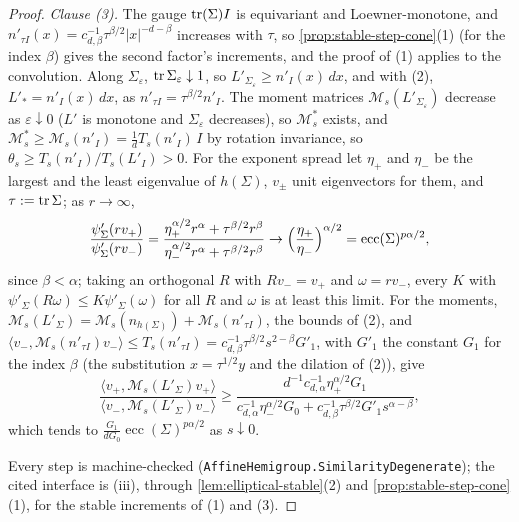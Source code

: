 \begin{proof}
\emph{Clause (3).} The gauge $\operatorname{tr}(\Sigma)I$ is equivariant and Loewner-monotone, and
$n'_{\tau I}(x) = c_{d,\beta}^{-1}\tau^{\beta/2}|x|^{-d-\beta}$ increases with $\tau$, so
\ref{prop:stable-step-cone}(1) (for the index $\beta$) gives the second factor's increments, and the
proof of (1) applies to the convolution. Along $\Sigma_\varepsilon$, $\operatorname{tr}\Sigma_\varepsilon \downarrow 1$, so
$L'_{\Sigma_\varepsilon} \ge n'_I(x)\,dx$, and with (2), $L'_* = n'_I(x)\,dx$, as
$n'_{\tau I} = \tau^{\beta/2}n'_I$. The moment matrices $\mathcal M_s(L'_{\Sigma_\varepsilon})$ decrease as $\varepsilon \downarrow 0$
($L'$ is monotone and $\Sigma_\varepsilon$ decreases), so $\mathcal M_s^*$ exists, and
$\mathcal M_s^* \ge \mathcal M_s(n'_I) = \tfrac1dT_s(n'_I)\,I$ by rotation invariance, so $\theta_s \ge
T_s(n'_I)/T_s(L'_I) > 0$. For the exponent spread let $\eta_+$ and $\eta_-$ be the largest and the least
eigenvalue of $h(\Sigma)$, $v_\pm$ unit eigenvectors for them, and $\tau := \operatorname{tr}\Sigma$; as $r \to \infty$,
\[
  \frac{\psi'_\Sigma(rv_+)}{\psi'_\Sigma(rv_-)} = \frac{\eta_+^{\alpha/2}r^\alpha + \tau^{\beta/2}r^\beta}{\eta_-^{\alpha/2}r^\alpha + \tau^{\beta/2}r^\beta}
  \to \Bigl(\frac{\eta_+}{\eta_-}\Bigr)^{\alpha/2} = \operatorname{ecc}(\Sigma)^{p\alpha/2} ,
\]
since $\beta < \alpha$; taking an orthogonal $R$ with $Rv_- = v_+$ and $\omega = rv_-$, every $K$ with
$\psi'_\Sigma(R\omega) \le K\psi'_\Sigma(\omega)$ for all $R$ and $\omega$ is at least this limit. For the moments, $\mathcal M_s(L'_\Sigma) = \mathcal M_s(n_{h(\Sigma)}) + \mathcal M_s(n'_{\tau I})$,
the bounds of (2), and $\langle v_-,\mathcal M_s(n'_{\tau I})v_-\rangle \le T_s(n'_{\tau I}) =
c_{d,\beta}^{-1}\tau^{\beta/2}s^{2-\beta}G'_1$, with $G'_1$ the constant $G_1$ for the index $\beta$ (the substitution
$x = \tau^{1/2}y$ and the dilation of (2)), give
\[
  \frac{\langle v_+,\mathcal M_s(L'_\Sigma)v_+\rangle}{\langle v_-,\mathcal M_s(L'_\Sigma)v_-\rangle}
  \ge \frac{d^{-1}c_{d,\alpha}^{-1}\eta_+^{\alpha/2}G_1}{c_{d,\alpha}^{-1}\eta_-^{\alpha/2}G_0 + c_{d,\beta}^{-1}\tau^{\beta/2}G'_1s^{\alpha-\beta}} ,
\]
which tends to $\frac{G_1}{dG_0}\operatorname{ecc}(\Sigma)^{p\alpha/2}$ as $s \downarrow 0$.

Every step is machine-checked (\texttt{AffineHemigroup.SimilarityDegenerate}); the cited interface is
(iii), through \ref{lem:elliptical-stable}(2) and \ref{prop:stable-step-cone}(1), for the stable
increments of (1) and (3).
\end{proof}

